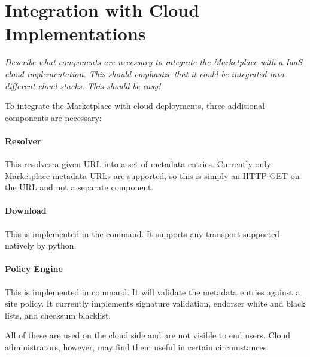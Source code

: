 \section{Integration with Cloud Implementations}
\label{sec:related-components}

{\em Describe what components are necessary to integrate the
  Marketplace with a IaaS cloud implementation. This should emphasize
  that it could be integrated into different cloud stacks.  This
  should be easy!}

To integrate the Marketplace with cloud deployments, three additional
components are necessary:

\paragraph{Resolver} This resolves a given URL into a set of metadata
  entries.  Currently only Marketplace metadata URLs are supported, so
  this is simply an HTTP GET on the URL and not a separate component.

\paragraph{Download} This is implemented in the
   command.  It supports any transport
  supported natively by python.

\paragraph{Policy Engine} This is implemented in 
  command.  It will validate the metadata entries against a site
  policy.  It currently implements signature validation, endorser
  white and black lists, and checksum blacklist.

All of these are used on the cloud side and are not visible to end
users.  Cloud administrators, however, may find them useful in certain
circumstances.
